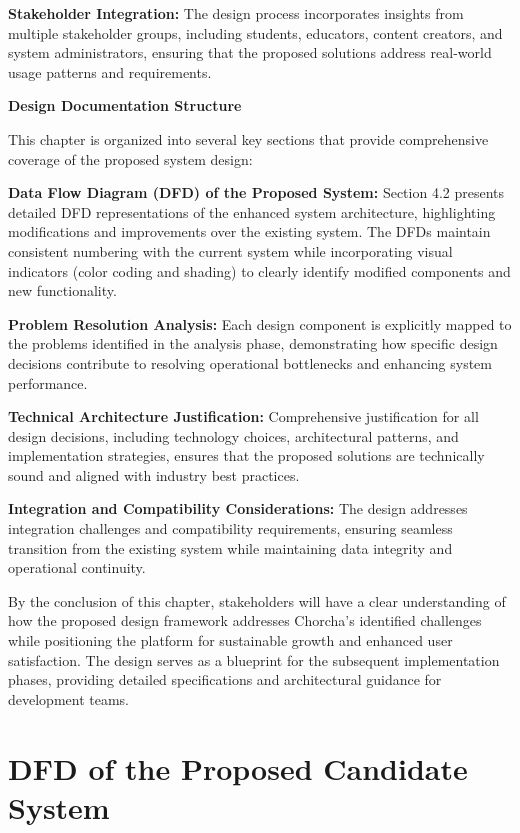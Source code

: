 \documentclass[12pt,a4paper,oneside]{book}
\begin{document}
\textbf{Stakeholder Integration:} The design process incorporates insights from multiple stakeholder groups, including students, educators, content creators, and system administrators, ensuring that the proposed solutions address real-world usage patterns and requirements.

\textbf{Design Documentation Structure}

This chapter is organized into several key sections that provide comprehensive coverage of the proposed system design:

\textbf{Data Flow Diagram (DFD) of the Proposed System:} Section 4.2 presents detailed DFD representations of the enhanced system architecture, highlighting modifications and improvements over the existing system. The DFDs maintain consistent numbering with the current system while incorporating visual indicators (color coding and shading) to clearly identify modified components and new functionality.

\textbf{Problem Resolution Analysis:} Each design component is explicitly mapped to the problems identified in the analysis phase, demonstrating how specific design decisions contribute to resolving operational bottlenecks and enhancing system performance.

\textbf{Technical Architecture Justification:} Comprehensive justification for all design decisions, including technology choices, architectural patterns, and implementation strategies, ensures that the proposed solutions are technically sound and aligned with industry best practices.

\textbf{Integration and Compatibility Considerations:} The design addresses integration challenges and compatibility requirements, ensuring seamless transition from the existing system while maintaining data integrity and operational continuity.

By the conclusion of this chapter, stakeholders will have a clear understanding of how the proposed design framework addresses Chorcha's identified challenges while positioning the platform for sustainable growth and enhanced user satisfaction. The design serves as a blueprint for the subsequent implementation phases, providing detailed specifications and architectural guidance for development teams.

\section{DFD of the Proposed Candidate System}
\end{document}
